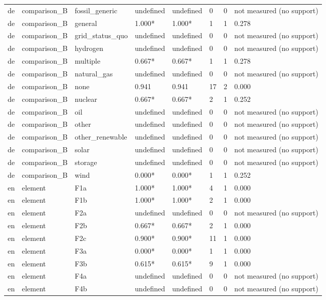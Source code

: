 \begin{table}[htbp]
\begin{tabular}{llllllll}
de & comparison\_B & fossil\_generic & undefined & undefined & 0 & 0 & not measured (no support) \\
de & comparison\_B & general & 1.000* & 1.000* & 1 & 1 & 0.278 \\
de & comparison\_B & grid\_status\_quo & undefined & undefined & 0 & 0 & not measured (no support) \\
de & comparison\_B & hydrogen & undefined & undefined & 0 & 0 & not measured (no support) \\
de & comparison\_B & multiple & 0.667* & 0.667* & 1 & 1 & 0.278 \\
de & comparison\_B & natural\_gas & undefined & undefined & 0 & 0 & not measured (no support) \\
de & comparison\_B & none & 0.941 & 0.941 & 17 & 2 & 0.000 \\
de & comparison\_B & nuclear & 0.667* & 0.667* & 2 & 1 & 0.252 \\
de & comparison\_B & oil & undefined & undefined & 0 & 0 & not measured (no support) \\
de & comparison\_B & other & undefined & undefined & 0 & 0 & not measured (no support) \\
de & comparison\_B & other\_renewable & undefined & undefined & 0 & 0 & not measured (no support) \\
de & comparison\_B & solar & undefined & undefined & 0 & 0 & not measured (no support) \\
de & comparison\_B & storage & undefined & undefined & 0 & 0 & not measured (no support) \\
de & comparison\_B & wind & 0.000* & 0.000* & 1 & 1 & 0.252 \\
en & element & F1a & 1.000* & 1.000* & 4 & 1 & 0.000 \\
en & element & F1b & 1.000* & 1.000* & 2 & 1 & 0.000 \\
en & element & F2a & undefined & undefined & 0 & 0 & not measured (no support) \\
en & element & F2b & 0.667* & 0.667* & 2 & 1 & 0.000 \\
en & element & F2c & 0.900* & 0.900* & 11 & 1 & 0.000 \\
en & element & F3a & 0.000* & 0.000* & 1 & 1 & 0.000 \\
en & element & F3b & 0.615* & 0.615* & 9 & 1 & 0.000 \\
en & element & F4a & undefined & undefined & 0 & 0 & not measured (no support) \\
en & element & F4b & undefined & undefined & 0 & 0 & not measured (no support) \\

\end{tabular}
\end{table}
